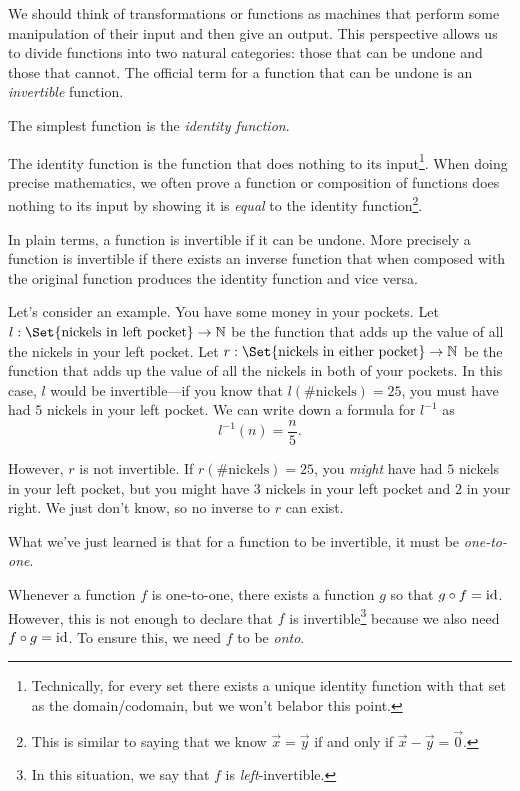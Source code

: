 
We should think of transformations or functions as machines
that perform some manipulation of their input and then give an output. This perspective 
allows us to divide functions into two natural categories: those that can be undone and
those that cannot. The official term for a function that can be undone is an
\emph{invertible} function.


The simplest function is the \emph{identity function}.


The identity function is the function that does nothing to its input\footnote{ Technically, for every
set there exists a unique identity function with that set as the domain/codomain, but we won't
belabor this point.}. When doing precise mathematics, we often prove a function or composition of functions
does nothing to its input by showing it is \emph{equal} to the identity function\footnote{ This is similar to saying that
we know $\vec x=\vec y$ if and only if $\vec x-\vec y=\vec 0$.}.

In plain terms, a function is invertible if it can be undone. More precisely a function
is invertible if there exists an inverse function that when composed with the original function
produces the identity function and vice versa.


Let's consider an example. You have some money in your 
pockets. Let $l:\Set{\text{nickels in left pocket}}\to \N$
be the function that adds up the value of all the nickels in your
left pocket. Let $r:\Set{\text{nickels in either pocket}}\to \N$
be the function that adds up the value of all the nickels in both of
your pockets. In this case, $l$ would be invertible---if you know that
$l(\text{\# nickels})=25$, you must have had $5$ nickels in your left pocket. We can write
down a formula for $l^{-1}$ as
\[
	l^{-1}(n)=\frac{n}{5}.
\]

However, $r$ is not invertible. If $r(\text{\# nickels})=25$, you \emph{might}
have had $5$ nickels in your left pocket, but you might have $3$ nickels in your left pocket
and $2$ in your right. We just don't know, so no inverse to $r$ can exist.

What we've just learned is that for a function to be invertible, it must be \emph{one-to-one}.


Whenever a function $f$ is one-to-one, there exists a function $g$ so that $g\circ f=\operatorname{\operatorname{id}}$.
However, this is not enough to declare that $f$ is invertible\footnote{ In this situation, we say that
$f$ is \emph{left}-invertible.} because we also need $f\circ g=\operatorname{\operatorname{id}}$. To ensure this, we need
$f$ to be \emph{onto}.


